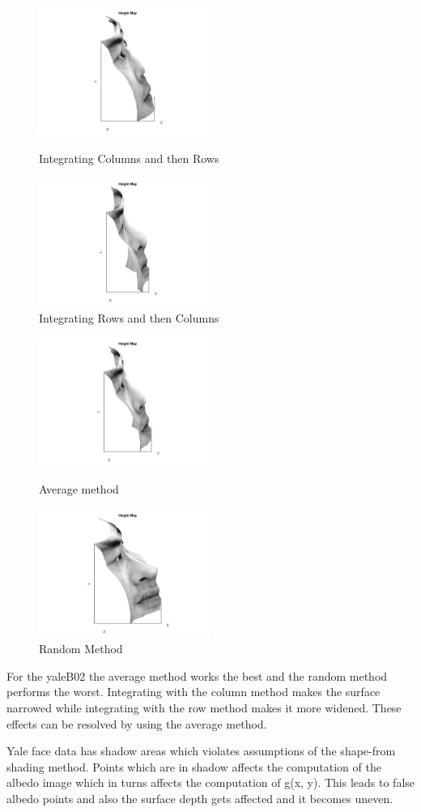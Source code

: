 \documentclass[fleqn]{article}
\begin{document}
\begin{figure}[h]
\includegraphics[width=0.5\textwidth]{ac copy.jpg}\caption{Integrating Columns and then Rows}
\includegraphics[width=0.5\textwidth]{ar copy.jpg}\caption{Integrating Rows and then Columns}
\end{figure}
\newpage
\begin{figure}[h]
\includegraphics[width=0.5\textwidth]{aa copy.jpg}\caption{Average method }
\includegraphics[width=0.5\textwidth]{aran copy.jpg}\caption{Random Method}
\end{figure}

\vspace{10 mm}
For the yaleB02 the average method works the best and the random method performs the worst.
Integrating with the column method makes the surface narrowed while integrating with the row method makes it more widened.
These effects can be resolved by using the average method.

Yale face data has shadow areas which violates assumptions of the shape-from shading method. Points which are in shadow affects the computation of the albedo image which in turns affects the computation of g(x, y).
This leads to false albedo points and also the surface depth gets affected and it becomes uneven.
\end{document}
